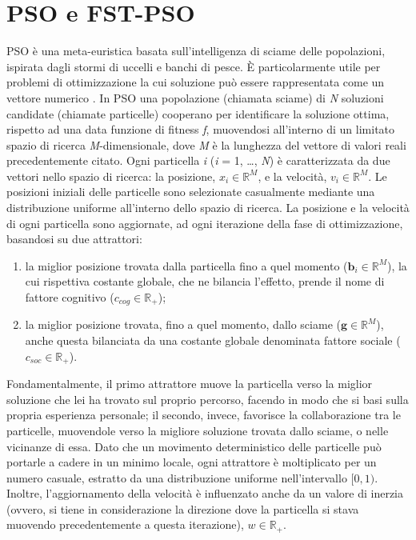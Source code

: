 \section{PSO e FST-PSO}
\label{sec:fstpso}
PSO è una meta-euristica basata sull'intelligenza di sciame delle popolazioni, ispirata dagli stormi di uccelli e banchi di pesce. 
È particolarmente utile per problemi di ottimizzazione la cui soluzione può essere rappresentata come un vettore numerico \cite{Kennedy1995}. 
In PSO una popolazione (chiamata sciame) di \textit{N} soluzioni candidate (chiamate particelle) cooperano per identificare la soluzione ottima, rispetto ad una data funzione di fitness \textit{f}, muovendosi all'interno di un limitato spazio di ricerca \textit{M}-dimensionale, dove \textit{M} è la lunghezza del vettore di valori reali precedentemente citato. 
Ogni particella \textit{i} (\textit{i} = 1, \dots, \textit{N}) è caratterizzata da due vettori nello spazio di ricerca: la posizione, $x_i \in \mathbb{R}^\textit{M}$, e la velocità, $v_i \in \mathbb{R}^\textit{M}$. Le posizioni iniziali delle particelle sono selezionate casualmente mediante una distribuzione uniforme all'interno dello spazio di ricerca. 
La posizione e la velocità di ogni particella sono aggiornate, ad ogni iterazione della fase di ottimizzazione, basandosi su due attrattori: \begin{enumerate}
	\item la miglior posizione trovata dalla particella fino a quel momento ($\textbf{b}_i \in \mathbb{R}^\textit{M}$), la cui rispettiva costante globale, che ne bilancia l'effetto, prende il nome di fattore cognitivo ($c_{cog} \in \mathbb{R}_+$);
	\item la miglior posizione trovata, fino a quel momento, dallo sciame ($\textbf{g} \in \mathbb{R}^\textit{M}$), anche questa bilanciata da una costante globale denominata fattore sociale ($c_{soc} \in \mathbb{R}_+$).
\end{enumerate}
Fondamentalmente, il primo attrattore muove la particella verso la miglior soluzione che lei ha trovato sul proprio percorso, facendo in modo che si basi sulla propria esperienza personale; il secondo, invece, favorisce la collaborazione tra le particelle, muovendole verso la migliore soluzione trovata dallo sciame, o nelle vicinanze di essa. 
Dato che un movimento deterministico delle particelle può portarle a cadere in un minimo locale, ogni attrattore è moltiplicato per un numero casuale, estratto da una distribuzione uniforme nell'intervallo $[0, 1)$. 
Inoltre, l'aggiornamento della velocità è influenzato anche da un valore di inerzia (ovvero, si tiene in considerazione la direzione dove la particella si stava muovendo precedentemente a questa iterazione), $\textit{w} \in \mathbb{R}_+$. 
